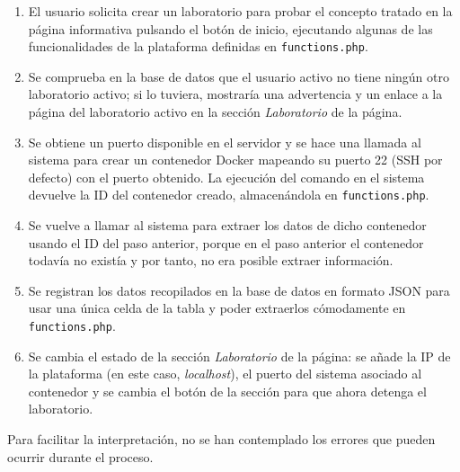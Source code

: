             \begin{enumerate}
                \item El usuario solicita crear un laboratorio para probar el concepto tratado en la página informativa pulsando el botón de inicio, ejecutando algunas de las funcionalidades de la plataforma definidas en \texttt{functions.php}.

                \item Se comprueba en la base de datos que el usuario activo no tiene ningún otro laboratorio activo; si lo tuviera, mostraría una advertencia y un enlace a la página del laboratorio activo en la sección \textit{Laboratorio} de la página.

                \item Se obtiene un puerto disponible en el servidor y se hace una llamada al sistema para crear un contenedor Docker mapeando su puerto 22 (SSH por defecto) con el puerto obtenido. La ejecución del comando en el sistema devuelve la ID del contenedor creado, almacenándola en \texttt{functions.php}.

                \item Se vuelve a llamar al sistema para extraer los datos de dicho contenedor usando el ID del paso anterior, porque en el paso anterior el contenedor todavía no existía y por tanto, no era posible extraer información.
                
                \item Se registran los datos recopilados en la base de datos en formato JSON para usar una única celda de la tabla y poder extraerlos cómodamente en \texttt{functions.php}.

                \item Se cambia el estado de la sección \textit{Laboratorio} de la página: se añade la IP de la plataforma (en este caso, \textit{localhost}), el puerto del sistema asociado al contenedor y se cambia el botón de la sección para que ahora detenga el laboratorio.
            \end{enumerate}

            Para facilitar la interpretación, no se han contemplado los errores que pueden ocurrir durante el proceso.
            
            \newpage


